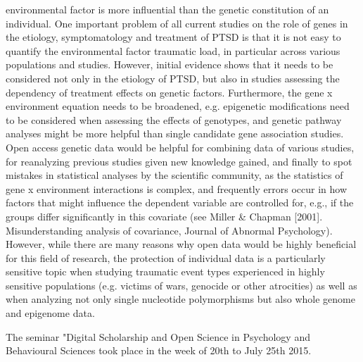 \documentclass[a4paper,UKenglish]{dagrep}
\begin{document}
environmental factor is more influential than the genetic constitution of an
individual. One important problem of all current studies on the role of genes in
the etiology, symptomatology and treatment of PTSD is that it is not easy to
quantify the environmental factor traumatic load, in particular across various
populations and studies. However, initial evidence shows that it needs to be
considered not only in the etiology of PTSD, but also in studies assessing the
dependency of treatment effects on genetic factors. Furthermore, the gene x
environment equation needs to be broadened, e.g. epigenetic modifications need
to be considered when assessing the effects of genotypes, and genetic pathway
analyses might be more helpful than single candidate gene association studies. 
Open access genetic data would be helpful for combining data of various studies,
for reanalyzing previous studies given new knowledge gained, and finally to spot
mistakes in statistical analyses by the scientific community, as the statistics
of gene x environment interactions is complex, and frequently errors occur in
how factors that might influence the dependent variable are controlled for,
e.g., if the groups differ significantly in this covariate (see Miller \& Chapman
[2001].  Misunderstanding analysis of covariance, Journal of Abnormal
Psychology). However, while there are many reasons why open data would be highly
beneficial for this field of research, the protection of individual data is a
particularly sensitive topic when studying traumatic event types experienced in
highly sensitive populations (e.g. victims of wars, genocide or other
atrocities) as well as when analyzing not only single nucleotide polymorphisms
but also whole genome and epigenome data. 

  


{}
\license
{}
The seminar "Digital Scholarship and Open Science in Psychology and 
Behavioural Sciences took place in the week of 20th to July 25th 2015.
\end{document}
